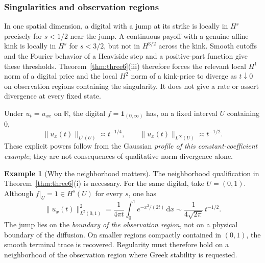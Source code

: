 \documentclass[11pt,a4paper]{article}
\theoremstyle{definition}\newtheorem{definition}{Definition}[section]\newtheorem{example}[theorem]{Example}
\theoremstyle{remark}\newtheorem{remark}[theorem]{Remark}\newtheorem{remarkSix}{Remark}[section]
\newcommand{\R}{\mathbb R}
\newcommand{\dd}{\,\mathrm d}
\newcommand{\norm}[1]{\lVert #1\rVert}
\begin{document}
\subsubsection{Singularities and observation regions}
\label{subsubsec:sing6}
In one spatial dimension, a digital with a jump at its strike is locally in $H^s$ precisely for $s<1/2$ near the jump. A continuous payoff with a genuine affine kink is locally in $H^s$ for $s<3/2$, but not in $H^{3/2}$ across the kink. Smooth cutoffs and the Fourier behavior of a Heaviside step and a positive-part function give these thresholds. Theorem~\ref{thm:three6}(iii) therefore forces the relevant local $H^1$ norm of a digital price and the local $H^2$ norm of a kink-price to diverge as $t\downarrow0$ on observation regions containing the singularity. It does not give a rate or assert divergence at every fixed state.

Under $u_t=u_{xx}$ on $\R$, the digital $f=\mathbf1_{(0,\infty)}$ has, on a fixed interval $U$ containing $0$,
\begin{equation}\label{eq:heatlayer6}
 \norm{u_x(t)}_{L^2(U)}\asymp t^{-1/4},
 \qquad \norm{u_x(t)}_{L^\infty(U)}\asymp t^{-1/2}.
\end{equation}
These explicit powers follow from the Gaussian \emph{profile of this constant-coefficient example}; they are not consequences of qualitative norm divergence alone.

\begin{example}[Why the neighborhood matters]\label{ex:neighbor6}
The neighborhood qualification in Theorem~\ref{thm:three6}(i) is necessary. For the same digital, take $U=(0,1)$. Although $f|_U=1\in H^s(U)$ for every $s$, one has
\begin{equation}\label{eq:boundarylayer6}
 \norm{u_x(t)}_{L^2(0,1)}^2
 =\frac{1}{4\pi t}\int_0^1e^{-x^2/(2t)}\dd x
 \sim\frac1{4\sqrt{2\pi}}\,t^{-1/2}.
\end{equation}
The jump lies on the \emph{boundary of the observation region}, not on a physical boundary of the diffusion. On smaller regions compactly contained in $(0,1)$, the smooth terminal trace is recovered. Regularity must therefore hold on a neighborhood of the observation region where Greek stability is requested.
\end{example}
\end{document}
